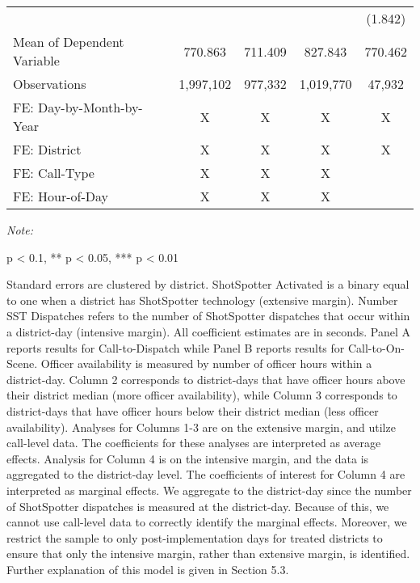 \begin{table}[H]
\begin{threeparttable}
\begin{tabular}[t]{lcccc}
\hspace{1em} &  &  &  & (1.842)\\
\hspace{1em}Mean of Dependent Variable & 770.863 & 711.409 & 827.843 & 770.462\\
\hspace{1em}Observations & 1,997,102 & 977,332 & 1,019,770 & 47,932\\
\midrule
FE: Day-by-Month-by-Year & X & X & X & X\\
FE: District & X & X & X & X\\
FE: Call-Type & X & X & X & \\
FE: Hour-of-Day & X & X & X & \\
\bottomrule
\end{tabular}
\begin{tablenotes}
\item \textit{Note: } 
\item * p < 0.1, ** p < 0.05, *** p < 0.01
\item Standard errors are clustered by district.                       ShotSpotter Activated is a binary equal to one when                      a district has ShotSpotter technology (extensive margin).                      Number SST Dispatches refers to the number of                      ShotSpotter dispatches that occur within a district-day (intensive margin).                      All coefficient estimates are in seconds. Panel A reports results for                      Call-to-Dispatch while Panel B reports results for Call-to-On-Scene.                      Officer availability is measured by number of officer hours within a district-day.                       Column 2 corresponds to district-days that have officer hours above                      their district median (more officer availability), while Column 3 corresponds to district-days that                      have officer hours below their district median (less officer availability). Analyses for                       Columns 1-3 are on the extensive margin, and utilze call-level data. The coefficients for these analyses                      are interpreted as average effects. Analysis for Column 4                      is on the intensive margin, and the data is aggregated to the district-day level. The                      coefficients of interest for Column 4 are interpreted as marginal effects. We                      aggregate to the district-day since the number of ShotSpotter dispatches is measured                      at the district-day. Because of this, we                      cannot use call-level data to correctly identify the marginal effects. Moreover,                      we restrict the sample to only post-implementation days for treated districts to                      ensure that only the intensive margin, rather than extensive margin, is identified. Further explanation                       of this model is                      given in Section 5.3.                   
\end{tablenotes}
\end{threeparttable}
\end{table}
